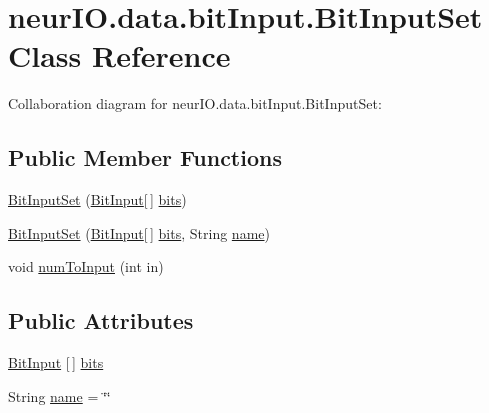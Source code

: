 \hypertarget{classneur_i_o_1_1data_1_1bit_input_1_1_bit_input_set}{}\section{neur\+I\+O.\+data.\+bit\+Input.\+Bit\+Input\+Set Class Reference}
\label{classneur_i_o_1_1data_1_1bit_input_1_1_bit_input_set}


Collaboration diagram for neur\+I\+O.\+data.\+bit\+Input.\+Bit\+Input\+Set\+:
\subsection*{Public Member Functions}
\begin{DoxyCompactItemize}
\item 
\hyperlink{classneur_i_o_1_1data_1_1bit_input_1_1_bit_input_set_ab677be938cd4f30a58140f641113e3ad}{Bit\+Input\+Set} (\hyperlink{classneur_i_o_1_1data_1_1bit_input_1_1_bit_input}{Bit\+Input}\mbox{[}$\,$\mbox{]} \hyperlink{classneur_i_o_1_1data_1_1bit_input_1_1_bit_input_set_ac9670d8e46af137a974fb229451df996}{bits})
\item 
\hyperlink{classneur_i_o_1_1data_1_1bit_input_1_1_bit_input_set_a6e620b4837378dc1421a2aae62ab329d}{Bit\+Input\+Set} (\hyperlink{classneur_i_o_1_1data_1_1bit_input_1_1_bit_input}{Bit\+Input}\mbox{[}$\,$\mbox{]} \hyperlink{classneur_i_o_1_1data_1_1bit_input_1_1_bit_input_set_ac9670d8e46af137a974fb229451df996}{bits}, String \hyperlink{classneur_i_o_1_1data_1_1bit_input_1_1_bit_input_set_ae983698847d96bf735ee7379114a0cbc}{name})
\item 
void \hyperlink{classneur_i_o_1_1data_1_1bit_input_1_1_bit_input_set_af33dc6f3bd675c235115c81ea8549ee0}{num\+To\+Input} (int in)
\end{DoxyCompactItemize}
\subsection*{Public Attributes}
\begin{DoxyCompactItemize}
\item 
\hyperlink{classneur_i_o_1_1data_1_1bit_input_1_1_bit_input}{Bit\+Input} \mbox{[}$\,$\mbox{]} \hyperlink{classneur_i_o_1_1data_1_1bit_input_1_1_bit_input_set_ac9670d8e46af137a974fb229451df996}{bits}
\item 
String \hyperlink{classneur_i_o_1_1data_1_1bit_input_1_1_bit_input_set_ae983698847d96bf735ee7379114a0cbc}{name} = \char`\"{}\char`\"{}
\end{DoxyCompactItemize}


